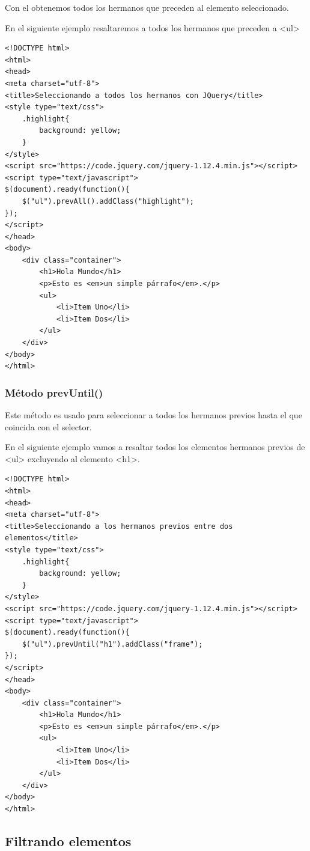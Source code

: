 \documentclass[11pt]{article}
\begin{document}
Con el obtenemos todos los hermanos que preceden al elemento seleccionado. 

En el siguiente ejemplo resaltaremos a todos los hermanos que preceden a <ul>

\begin{verbatim}
<!DOCTYPE html>
<html>
<head>
<meta charset="utf-8">
<title>Seleccionando a todos los hermanos con JQuery</title>
<style type="text/css">
    .highlight{
        background: yellow;
    }        
</style>
<script src="https://code.jquery.com/jquery-1.12.4.min.js"></script>
<script type="text/javascript">
$(document).ready(function(){
    $("ul").prevAll().addClass("highlight");
});
</script>
</head>
<body>
    <div class="container">
        <h1>Hola Mundo</h1>
        <p>Esto es <em>un simple párrafo</em>.</p>
        <ul>
            <li>Item Uno</li>
            <li>Item Dos</li>
        </ul>
    </div>
</body>
</html>                                		
\end{verbatim}

\subsubsection*{Método prevUntil()}
\label{sec:org6322a78}

Este método es usado para seleccionar a todos los hermanos previos hasta el que coincida con el selector. 

En el siguiente ejemplo vamos a resaltar todos los elementos hermanos previos de <ul> excluyendo al elemento <h1>. 

\begin{verbatim}
<!DOCTYPE html>
<html>
<head>
<meta charset="utf-8">
<title>Seleccionando a los hermanos previos entre dos elementos</title>
<style type="text/css">
    .highlight{
        background: yellow;
    }        
</style>
<script src="https://code.jquery.com/jquery-1.12.4.min.js"></script>
<script type="text/javascript">
$(document).ready(function(){
    $("ul").prevUntil("h1").addClass("frame");
});
</script>
</head>
<body>
    <div class="container">
        <h1>Hola Mundo</h1>
        <p>Esto es <em>un simple párrafo</em>.</p>
        <ul>
            <li>Item Uno</li>
            <li>Item Dos</li>
        </ul>
    </div>
</body>
</html>                                		
\end{verbatim}

\subsection*{Filtrando elementos}
\label{sec:org906abce}
\end{document}
